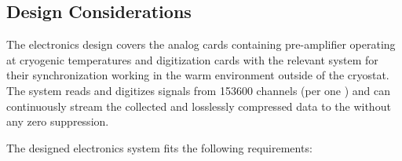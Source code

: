 \subsection{Design Considerations}
\label{ssec:dp-tpcelec-requir}

The  electronics design covers the analog  cards containing pre-amplifier  operating at cryogenic temperatures and digitization cards with the relevant system for their synchronization working in the warm environment outside of the cryostat. The system reads and digitizes signals from \num{153600} channels (per one ) and can continuously stream the collected and losslessly compressed data to the  without any zero suppression. 

The designed  electronics system fits the following requirements:
